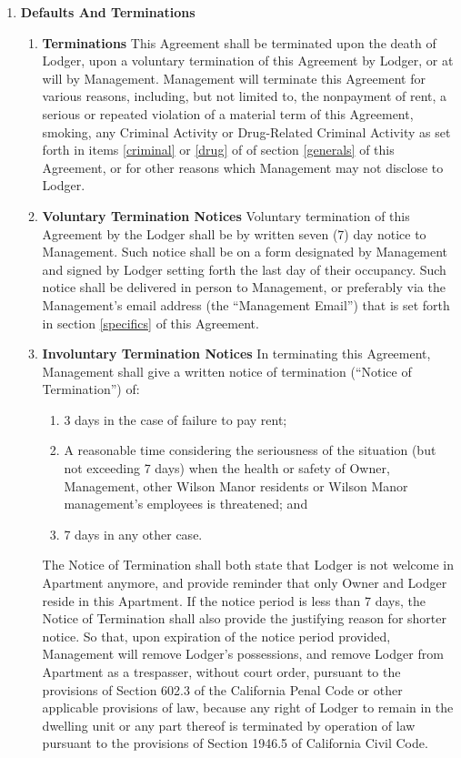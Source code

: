 \documentclass[12pt,letterpaper]{article}
\newcommand{\lodger}{Lodger}
\newcommand{\management}{Management}
\newcommand{\myemail}{Management Email}
\newcommand{\condo}{Wilson Manor}
\newcommand{\apt}{Apartment}
\newcommand{\room}{Room}
\begin{document}
\begin{enumerate}
\begin{enumerate}
			\item \textbf{Housekeeping Inspections} \quad At least twice a year, \management{} shall inspect the \room{} for the purpose of ascertaining the condition of the \room{}. Such inspection shall be routine. 
		\end{enumerate}
	\item \textbf{Defaults And Terminations} \quad 
		\begin{enumerate}
			\item \textbf{Terminations} \quad 
				This Agreement shall be terminated upon the death of \lodger{}, upon a voluntary termination of this Agreement by \lodger{}, or at will by \management{}. \management{} will terminate this Agreement for various reasons, including, but not limited to, the nonpayment of rent, a serious or repeated violation of a material term of this Agreement, smoking, any Criminal Activity or Drug-Related Criminal Activity as set forth in items \ref{criminal} or \ref{drug} of of section \ref{generals} of this Agreement, or for other reasons which \management{} may not disclose to \lodger{}.
			\item \textbf{Voluntary Termination Notices} \quad 
				Voluntary termination of this Agreement by the \lodger{} shall be by written seven (7) day notice to \management{}. Such notice shall be on a form designated by \management{} and signed by \lodger{} setting forth the last day of their occupancy. Such notice shall be delivered in person to \management{}, or preferably via the \management{}'s email address (the ``\myemail{}'') that is set forth in section \ref{specifics} of this Agreement{}. 
			\item \textbf{Involuntary Termination Notices} \label{terminate}
				\quad In terminating this Agreement, \management{} shall give a written notice of termination (``Notice of Termination'') of: 
				\begin{enumerate}
					\item 3 days in the case of failure to pay rent; 
					\item A reasonable time considering the seriousness of the situation (but not exceeding 7 days) when the health or safety of Owner, \management{}, other \condo{} residents or \condo{} management's employees is threatened; and 
					\item 7 days in any other case. 
				\end{enumerate} 
				The Notice of Termination shall both state that \lodger{} is not welcome in \apt{} anymore, and provide reminder that only Owner and \lodger{} reside in this \apt{}. If the notice period is less than 7 days, the Notice of Termination shall also provide the justifying reason for shorter notice. So that, upon expiration of the notice period provided, \management{} will remove \lodger{}'s possessions, and remove \lodger{} from \apt{} as a trespasser, without court order, pursuant to the provisions of Section 602.3 of the California Penal Code or other applicable provisions of law, because any right of \lodger{} to remain in the dwelling unit or any part thereof is terminated by operation of law pursuant to the provisions of Section 1946.5 of California Civil Code.

\end{enumerate}
\end{enumerate}
\end{document}
